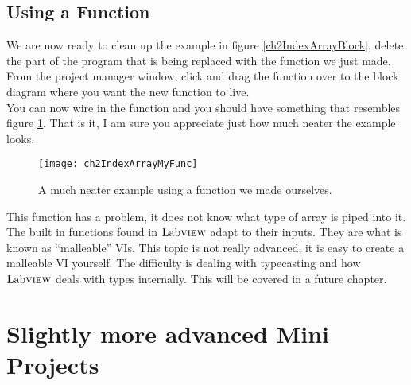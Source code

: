 \subsection{Using a Function}
We are now ready to clean up the example in figure \ref{ch2IndexArrayBlock}, delete the part of the program that is being replaced with the function we just made. From the project manager window, click and drag the function over to the block diagram where you want the new function to live.\\

You can now wire in the function and you should have something that resembles figure \ref{ch2IndexArrayMyFunc}. That is it, I am sure you appreciate just how much neater the example looks.\\
\begin{figure}
	\centering
	\texttt{[image: ch2IndexArrayMyFunc]}
	\caption{A much neater example using a function we made ourselves.}
	\label{ch2IndexArrayMyFunc}
\end{figure}

This function has a problem, it does not know what type of array is piped into it. The built in functions found in $\text{Lab}\textsc{view}$ adapt to their inputs. They are what is known as ``malleable'' VIs. This topic is not really advanced, it is easy to create a malleable VI yourself. The difficulty is dealing with typecasting and how $\text{Lab}\textsc{view}$ deals with types internally. This will be covered in a future chapter.\\ 
\section{Slightly more advanced Mini Projects}